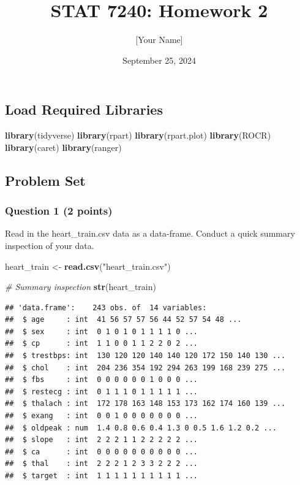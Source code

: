 \documentclass[
]{article}
\title{STAT 7240: Homework 2}
\author{{[}Your Name{]}}
\date{September 25, 2024}
\newenvironment{Shaded}{\begin{snugshade}}{\end{snugshade}}
\newcommand{\CommentTok}[1]{\textcolor[rgb]{0.56,0.35,0.01}{\textit{#1}}}
\newcommand{\FunctionTok}[1]{\textcolor[rgb]{0.13,0.29,0.53}{\textbf{#1}}}
\newcommand{\NormalTok}[1]{#1}
\newcommand{\OtherTok}[1]{\textcolor[rgb]{0.56,0.35,0.01}{#1}}
\newcommand{\StringTok}[1]{\textcolor[rgb]{0.31,0.60,0.02}{#1}}
\begin{document}
\maketitle

\subsection{Load Required Libraries}\label{load-required-libraries}

\begin{Shaded}
\begin{Highlighting}[]
\FunctionTok{library}\NormalTok{(tidyverse)}
\FunctionTok{library}\NormalTok{(rpart)}
\FunctionTok{library}\NormalTok{(rpart.plot)}
\FunctionTok{library}\NormalTok{(ROCR)}
\FunctionTok{library}\NormalTok{(caret)}
\FunctionTok{library}\NormalTok{(ranger)}
\end{Highlighting}
\end{Shaded}

\subsection{Problem Set}\label{problem-set}

\subsubsection{Question 1 (2 points)}\label{question-1-2-points}

Read in the heart\_train.csv data as a data-frame. Conduct a quick
summary inspection of your data.

\begin{Shaded}
\begin{Highlighting}[]
\NormalTok{heart\_train }\OtherTok{\textless{}{-}} \FunctionTok{read.csv}\NormalTok{(}\StringTok{"heart\_train.csv"}\NormalTok{)}

\CommentTok{\# Summary inspection}
\FunctionTok{str}\NormalTok{(heart\_train)}
\end{Highlighting}
\end{Shaded}

\begin{verbatim}
## 'data.frame':    243 obs. of  14 variables:
##  $ age     : int  41 56 57 57 56 44 52 57 54 48 ...
##  $ sex     : int  0 1 0 1 0 1 1 1 1 0 ...
##  $ cp      : int  1 1 0 0 1 1 2 2 0 2 ...
##  $ trestbps: int  130 120 120 140 140 120 172 150 140 130 ...
##  $ chol    : int  204 236 354 192 294 263 199 168 239 275 ...
##  $ fbs     : int  0 0 0 0 0 0 1 0 0 0 ...
##  $ restecg : int  0 1 1 1 0 1 1 1 1 1 ...
##  $ thalach : int  172 178 163 148 153 173 162 174 160 139 ...
##  $ exang   : int  0 0 1 0 0 0 0 0 0 0 ...
##  $ oldpeak : num  1.4 0.8 0.6 0.4 1.3 0 0.5 1.6 1.2 0.2 ...
##  $ slope   : int  2 2 2 1 1 2 2 2 2 2 ...
##  $ ca      : int  0 0 0 0 0 0 0 0 0 0 ...
##  $ thal    : int  2 2 2 1 2 3 3 2 2 2 ...
##  $ target  : int  1 1 1 1 1 1 1 1 1 1 ...
\end{verbatim}
\end{document}
